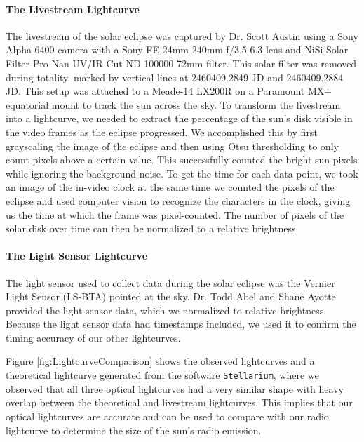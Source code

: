 \paragraph{The Livestream Lightcurve}
The livestream of the solar eclipse was captured by Dr. Scott Austin using a Sony Alpha 6400 camera with a Sony FE 24mm-240mm f/3.5-6.3 lens and NiSi Solar Filter Pro Nan UV/IR Cut ND 100000 72mm filter.
This solar filter was removed during totality, marked by vertical lines at 2460409.2849 JD and 2460409.2884 JD.
This setup was attached to a Meade-14 LX200R on a Paramount MX+ equatorial mount to track the sun across the sky.
To transform the livestream into a lightcurve, we needed to extract the percentage of the sun's disk visible in the video frames as the eclipse progressed.
We accomplished this by first grayscaling the image of the eclipse and then using Otsu thresholding \cite{otsu_1979} to only count pixels above a certain value.
This successfully counted the bright sun pixels while ignoring the background noise.
To get the time for each data point, we took an image of the in-video clock at the same time we counted the pixels of the eclipse and used computer vision to recognize the characters in the clock, giving us the time at which the frame was pixel-counted.
The number of pixels of the solar disk over time can then be normalized to a relative brightness.
\paragraph{The Light Sensor Lightcurve}
The light sensor used to collect data during the solar eclipse was the Vernier Light Sensor (LS-BTA) pointed at the sky.
Dr. Todd Abel and Shane Ayotte provided the light sensor data, which we normalized to relative brightness.
Because the light sensor data had timestamps included, we used it to confirm the timing accuracy of our other lightcurves.

Figure \ref{fig:LightcurveComparison} shows the observed lightcurves and a theoretical lightcurve generated from the software \texttt{Stellarium}, where we observed that all three optical lightcurves had a very similar shape with heavy overlap between the theoretical and livestream lightcurves.
This implies that our optical lightcurves are accurate and can be used to compare with our radio lightcurve to determine the size of the sun's radio emission.
